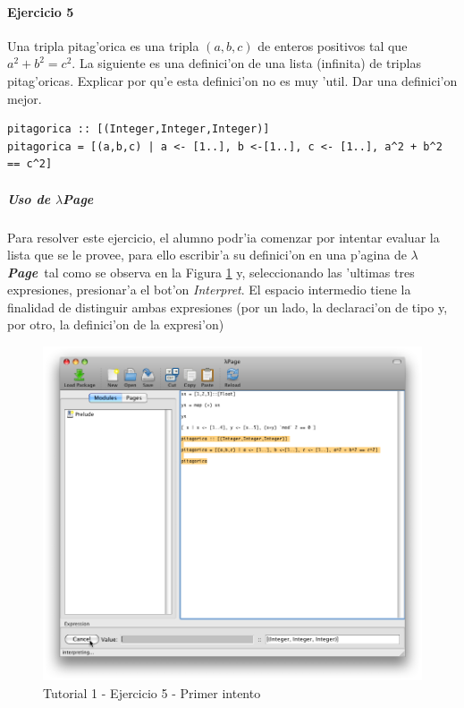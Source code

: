 \documentclass[a4paper]{article}
\newcommand{\hpage}{\textbf{\textsl{$\lambda$Page}}}
\begin{document}
\paragraph{Ejercicio 5}Una tripla pitag'orica es una tripla $(a,b,c)$ de enteros positivos tal que $a^{2} + b^{2} = c^{2}$.  La siguiente es una definici'on de una lista (infinita) de triplas pitag'oricas.  Explicar por qu'e esta definici'on no es muy 'util.  Dar una definici'on mejor.
\begin{center}\begin{lstlisting}
pitagorica :: [(Integer,Integer,Integer)] 
pitagorica = [(a,b,c) | a <- [1..], b <-[1..], c <- [1..], a^2 + b^2 == c^2] 
\end{lstlisting}\end{center}
\subparagraph{Uso de \hpage}Para resolver este ejercicio, el alumno podr'ia comenzar por intentar evaluar la lista que se le provee, para ello escribir'a su definici'on en una p'agina de \hpage\ tal como se observa en la Figura \ref{tut103} y, seleccionando las 'ultimas tres expresiones, presionar'a el bot'on \textsl{Interpret}.  El espacio intermedio tiene la finalidad de distinguir ambas expresiones (por un lado, la declaraci'on de tipo y, por otro, la definici'on de la expresi'on)
\begin{figure}[hp]
	\begin{center}
        	\includegraphics[width=.75\textwidth]{pictures/tut1/03}
		\caption{Tutorial 1 - Ejercicio 5 - Primer intento}
		\label{tut103}
	\end{center}
\end{figure}
\end{document}
